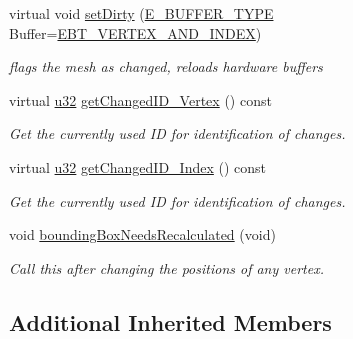\begin{DoxyCompactItemize}
\mbox{\label{structirr_1_1scene_1_1SSkinMeshBuffer_ae4c0ce6333329191929e2023c9727a3a}} 
virtual void \hyperlink{structirr_1_1scene_1_1SSkinMeshBuffer_ae4c0ce6333329191929e2023c9727a3a}{set\+Dirty} (\hyperlink{namespaceirr_1_1scene_a8f59a89ffef0ad8e5b2c2cb874a93e8c}{E\+\_\+\+B\+U\+F\+F\+E\+R\+\_\+\+T\+Y\+PE} Buffer=\hyperlink{namespaceirr_1_1scene_a8f59a89ffef0ad8e5b2c2cb874a93e8ca833624730c30cffccc121fe31aa0832c}{E\+B\+T\+\_\+\+V\+E\+R\+T\+E\+X\+\_\+\+A\+N\+D\+\_\+\+I\+N\+D\+EX})
\begin{DoxyCompactList}\small\item\em flags the mesh as changed, reloads hardware buffers \end{DoxyCompactList}\item 
virtual \hyperlink{namespaceirr_a0416a53257075833e7002efd0a18e804}{u32} \hyperlink{structirr_1_1scene_1_1SSkinMeshBuffer_a94faa430425d73fbb6cab74ac65af1c1}{get\+Changed\+I\+D\+\_\+\+Vertex} () const
\begin{DoxyCompactList}\small\item\em Get the currently used ID for identification of changes. \end{DoxyCompactList}\item 
virtual \hyperlink{namespaceirr_a0416a53257075833e7002efd0a18e804}{u32} \hyperlink{structirr_1_1scene_1_1SSkinMeshBuffer_a60b444cfe4b0cec6d2cc4bdf7958dd16}{get\+Changed\+I\+D\+\_\+\+Index} () const
\begin{DoxyCompactList}\small\item\em Get the currently used ID for identification of changes. \end{DoxyCompactList}\item 
\mbox{\label{structirr_1_1scene_1_1SSkinMeshBuffer_af3460f6a2bb4b53b60d03d162f0d6fa6}} 
void \hyperlink{structirr_1_1scene_1_1SSkinMeshBuffer_af3460f6a2bb4b53b60d03d162f0d6fa6}{bounding\+Box\+Needs\+Recalculated} (void)
\begin{DoxyCompactList}\small\item\em Call this after changing the positions of any vertex. \end{DoxyCompactList}\end{DoxyCompactItemize}
\subsection*{Additional Inherited Members}


